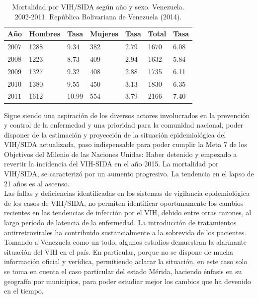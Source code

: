\begin{table}[H]	
\begin{center}
\begin{tabular}{|l|l|l|l|l|l|l|}
\hline
A\~no & Hombres & Tasa & Mujeres & Tasa & Total & Tasa  \\ \hline
2007 & 1288 & 9.34 & 382 & 2.79 & 1670 & 6.08 \\ \hline
2008 & 1223 & 8.73 & 409 & 2.94 & 1632 & 5.84 \\ \hline
2009 & 1327 & 9.32 & 408 & 2.88 & 1735 & 6.11 \\ \hline
2010 & 1380 & 9.55 & 450 & 3.13 & 1830 & 6.35 \\ \hline
2011 & 1612 & 10.99 & 554 & 3.79 & 2166 & 7.40 \\ \hline

     
\end{tabular}
\caption{Mortalidad por VIH/SIDA seg\'un a\~no y sexo. Venezuela. 2002-2011. Rep\'ublica Bolivariana de Venezuela (2014).}
\label{tabla:mortalidad}
\end{center}
\end{table}

	Sigue siendo una aspiraci\'on de los diversos actores involucrados en la prevenci\'on y control de la enfermedad y una prioridad para la comunidad nacional, poder disponer de la estimaci\'on y proyecci\'on de la situaci\'on epidemiol\'ogica del VIH/SIDA actualizada, paso indispensable para poder cumplir la Meta 7 de los Objetivos del Milenio de las Naciones Unidas: Haber detenido y empezado a revertir la incidencia del VIH-SIDA en el año 2015.  La mortalidad por VIH/SIDA, se caracteriz\'o por un aumento progresivo. La tendencia en el lapso de 21 a\~nos es al ascenso. \textit{\citet{alerta}} \\

	Las fallas y deficiencias identificadas en los sistemas de vigilancia epidemiol\'ogica de los casos de VIH/SIDA, no permiten identificar oportunamente los cambios recientes en las tendencias de infecci\'on por el VIH, debido entre otras razones, al largo per\'iodo de latencia de la enfermedad. La introducci\'on de tratamientos antirretrovirales ha contribuido sustancialmente a la sobrevida de los pacientes.\\

	Tomando a Venezuela como un todo, algunos estudios demuestran la alarmante situaci\'on del VIH en el pa\'is. En particular, porque no se dispone de mucha informaci\'on oficial y ver\'idica, permitiendo aclarar la situaci\'on, en este caso solo se toma en cuenta el caso particular del estado M\'erida, haciendo \'enfasis en su geograf\'ia por municipios, para poder estudiar mejor los cambios que ha devenido en el tiempo.

